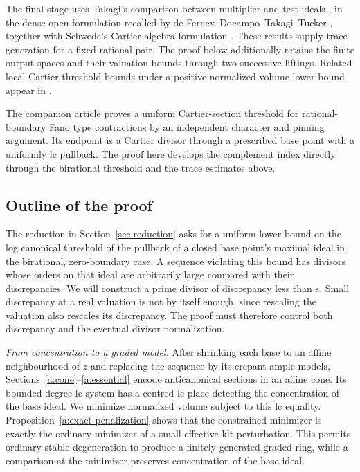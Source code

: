 The final stage uses Takagi's comparison between multiplier and test ideals
\cite{Takagi}, in the dense-open formulation recalled by
de Fernex--Docampo--Takagi--Tucker \cite[Theorem~11]{DFDTT}, together
with Schwede's Cartier-algebra formulation
\cite{SchwedeNonQG}. These results supply trace generation for a fixed
rational pair. The proof below additionally retains the finite output
spaces and their valuation bounds through two successive liftings.
Related local Cartier-threshold bounds under a positive normalized-volume
lower bound appear in \cite[Theorem~1.7]{HanLiuQiLocalVolumes}.

The companion article \cite[Theorem~1]{OpenAICartier} proves a uniform
Cartier-section threshold for rational-boundary Fano type contractions
by an independent character and pinning argument. Its endpoint is a
Cartier divisor through a prescribed base point with a uniformly lc
pullback. The proof here develops the complement index directly through
the birational threshold and the trace estimates above.

\subsection{Outline of the proof}

The reduction in Section~\ref{sec:reduction} asks for a uniform lower
bound on the log canonical threshold of the pullback of a closed base
point's maximal ideal in the birational, zero-boundary case. A sequence
violating this bound has divisors whose
orders on that ideal are arbitrarily large compared with their discrepancies.
We will construct a prime divisor of discrepancy less than $\epsilon$.
Small discrepancy at a real valuation is not by itself enough, since
rescaling the valuation also rescales its discrepancy. The proof must
therefore control both discrepancy and the eventual divisor normalization.

\smallskip\noindent
\emph{From concentration to a graded model.}
After shrinking each base to an affine neighbourhood of $z$ and replacing
the sequence by its crepant ample models,
Sections~\ref{a:cone}--\ref{a:essential} encode anticanonical sections in
an affine cone. Its bounded-degree lc system has a centred lc place
detecting the concentration of the base ideal. We minimize normalized
volume subject to this lc equality. Proposition~\ref{a:exact-penalization}
shows that the constrained minimizer is exactly the ordinary minimizer of
a small effective klt perturbation. This permits ordinary stable
degeneration to produce a finitely generated graded ring, while a
comparison at the minimizer preserves concentration of the base ideal.

